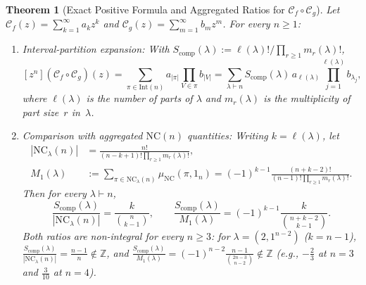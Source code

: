\documentclass[11pt]{article}
\newtheorem{theorem}{Theorem}[section]
\theoremstyle{definition}
\newcommand{\NC}{\mathrm{NC}}
\newcommand{\IntP}{\mathrm{Int}}
\begin{document}
\begin{theorem}[Exact Positive Formula and Aggregated Ratios for $\mathcal{C}_f \circ \mathcal{C}_g$]\label{thm:exact-opB}
Let $\mathcal{C}_f(z) = \sum_{k=1}^{\infty} a_k z^k$ and $\mathcal{C}_g(z) = \sum_{m=1}^{\infty} b_m z^m$. For every $n \ge 1$:
\begin{enumerate}
  \item[(a)] \emph{Interval-partition expansion:} With $S_{\mathrm{comp}}(\lambda) := \ell(\lambda)! / \prod_{r \ge 1} m_r(\lambda)!$,
  \begin{equation}\label{eq:interval-expansion}
    [z^n](\mathcal{C}_f \circ \mathcal{C}_g)(z)
    = \sum_{\pi \in \IntP(n)} a_{|\pi|} \prod_{V \in \pi} b_{|V|}
    = \sum_{\lambda \vdash n} S_{\mathrm{comp}}(\lambda)\,a_{\ell(\lambda)} \prod_{j=1}^{\ell(\lambda)} b_{\lambda_j},
  \end{equation}
  where $\ell(\lambda)$ is the number of parts of $\lambda$ and $m_r(\lambda)$ is the multiplicity of part size~$r$ in~$\lambda$.
  \item[(b)] \emph{Comparison with aggregated $\NC(n)$ quantities:} Writing $k = \ell(\lambda)$, let
  \begin{align*}
    |\NC_\lambda(n)| &= \frac{n!}{(n - k + 1)!\prod_{r \ge 1} m_r(\lambda)!}, \\
    M_1(\lambda) &:= \sum_{\pi \in \NC_\lambda(n)} \mu_{\NC}(\pi, 1_n)
    = (-1)^{k-1} \frac{(n + k - 2)!}{(n - 1)!\prod_{r \ge 1} m_r(\lambda)!}.
  \end{align*}
  Then for every $\lambda \vdash n$,
  \begin{equation}\label{eq:ratios}
    \frac{S_{\mathrm{comp}}(\lambda)}{|\NC_\lambda(n)|} = \frac{k}{\binom{n}{k-1}}, \qquad
    \frac{S_{\mathrm{comp}}(\lambda)}{M_1(\lambda)} = (-1)^{k-1}\frac{k}{\binom{n + k - 2}{k - 1}}.
  \end{equation}
  Both ratios are non-integral for every $n \ge 3$: for $\lambda = (2, 1^{n-2})$ ($k = n - 1$), $\frac{S_{\mathrm{comp}}(\lambda)}{|\NC_\lambda(n)|} = \frac{n-1}{n} \notin \mathbb{Z}$, and $\frac{S_{\mathrm{comp}}(\lambda)}{M_1(\lambda)} = (-1)^{n-2}\frac{n-1}{\binom{2n-3}{n-2}} \notin \mathbb{Z}$ (e.g., $-\frac{2}{3}$ at $n = 3$ and $\frac{3}{10}$ at $n = 4$).
\end{enumerate}
\end{theorem}
\end{document}
